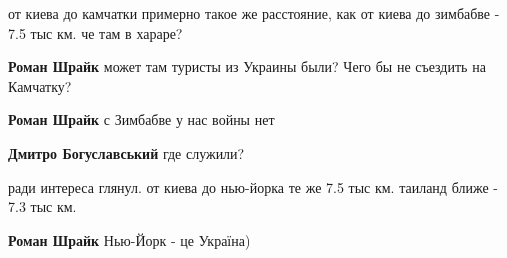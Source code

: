 \begin{itemize}
от киева до камчатки примерно такое же расстояние, как от киева до зимбабве -
7.5 тыс км. че там в хараре?

\begin{itemize}
 
\textbf{Роман Шрайк} может там туристы из Украины были? Чего бы не съездить на Камчатку?

 
\textbf{Роман Шрайк} с Зимбабве у нас войны нет

\begin{itemize}
 
\textbf{Дмитро Богуславський} где служили?
\end{itemize}

 

ради интереса глянул. от киева до нью-йорка те же 7.5 тыс км. таиланд ближе -
7.3 тыс км.

\begin{itemize}
 
\textbf{Роман Шрайк} Нью-Йорк - це Україна)
\end{itemize}

 

\end{itemize}
\end{itemize}
